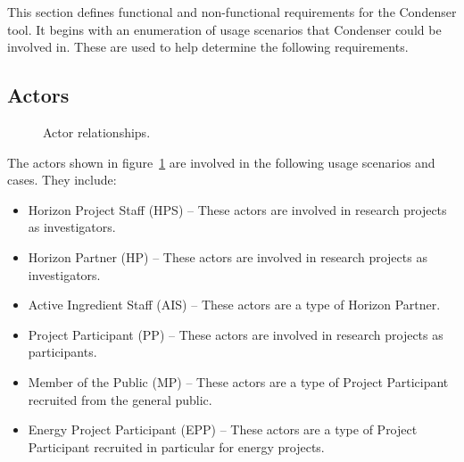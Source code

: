 This section defines functional and non-functional requirements for the Condenser tool. It begins with an enumeration of usage scenarios that Condenser could be involved in. These are used to help determine the following requirements.

\subsection{Actors}
\begin{center}
	\begin{figure}[htbp]
		\caption{Actor relationships.\label{ActorRelationships}}
	\end{figure}
\end{center}	
The actors shown in figure~\ref{ActorRelationships} are involved in the following usage scenarios and cases. They include:
\begin{itemize}
	\item Horizon Project Staff (HPS) -- These actors are involved in research projects as investigators.
	\item Horizon Partner (HP) -- These actors are involved in research projects as investigators. 
	\item Active Ingredient Staff (AIS) -- These actors are a type of Horizon Partner. 
	\item Project Participant (PP) -- These actors are involved in research projects as participants. 
	\item Member of the Public (MP) -- These actors are a type of Project Participant recruited from the general public.
	\item Energy Project Participant (EPP) -- These actors are a type of Project Participant recruited in particular for energy projects.
\end{itemize}


